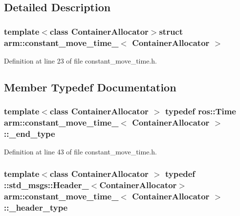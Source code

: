 \subsection{\-Detailed \-Description}
\subsubsection*{template$<$class Container\-Allocator$>$struct arm\-::constant\-\_\-move\-\_\-time\-\_\-$<$ Container\-Allocator $>$}



\-Definition at line 23 of file constant\-\_\-move\-\_\-time.\-h.



\subsection{\-Member \-Typedef \-Documentation}
\subsubsection[{\-\_\-end\-\_\-type}]{\setlength{\rightskip}{0pt plus 5cm}template$<$class Container\-Allocator $>$ typedef ros\-::\-Time {\bf arm\-::constant\-\_\-move\-\_\-time\-\_\-}$<$ \-Container\-Allocator $>$\-::{\bf \-\_\-end\-\_\-type}}\label{structarm_1_1constant__move__time___a8090c468d49324052cb8fb93d062871c}


\-Definition at line 43 of file constant\-\_\-move\-\_\-time.\-h.

\subsubsection[{\-\_\-header\-\_\-type}]{\setlength{\rightskip}{0pt plus 5cm}template$<$class Container\-Allocator $>$ typedef \-::std\-\_\-msgs\-::\-Header\-\_\-$<$\-Container\-Allocator$>$ {\bf arm\-::constant\-\_\-move\-\_\-time\-\_\-}$<$ \-Container\-Allocator $>$\-::{\bf \-\_\-header\-\_\-type}}\label{structarm_1_1constant__move__time___ac00c94e4c2af2db35243aa07aa4dc17f}


